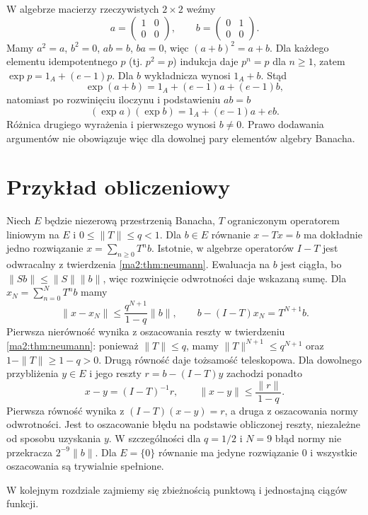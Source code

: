 \begin{przyklad}
\label{ma2:ex:exp-noncommuting}
W algebrze macierzy rzeczywistych $2\times2$ weźmy
\[
 a=\begin{pmatrix}1&0\\0&0\end{pmatrix},
 \qquad b=\begin{pmatrix}0&1\\0&0\end{pmatrix}.
\]
Mamy $a^2=a$, $b^2=0$, $ab=b$, $ba=0$,
więc $(a+b)^2=a+b$. Dla każdego elementu
idempotentnego $p$ (tj. $p^2=p$) indukcja daje
$p^n=p$ dla $n\ge1$, zatem
$\exp p=1_A+(e-1)p$. Dla $b$ wykładnicza
wynosi $1_A+b$. Stąd
\[
 \exp(a+b)=1_A+(e-1)a+(e-1)b,
\]
natomiast po rozwinięciu iloczynu i podstawieniu $ab=b$
\[
 (\exp a)(\exp b)=1_A+(e-1)a+eb.
\]
Różnica drugiego wyrażenia i pierwszego wynosi $b\ne0$.
Prawo dodawania argumentów nie obowiązuje więc
dla dowolnej pary elementów algebry Banacha.
\end{przyklad}

\section{Przykład obliczeniowy}

\begin{przyklad}
\label{ma2:ex:neumann-equation}
Niech $E$ będzie niezerową przestrzenią Banacha,
$T$ ograniczonym operatorem liniowym na $E$
i $0\le\|T\|\le q<1$.
Dla $b\in E$ równanie $x-Tx=b$ ma dokładnie jedno
rozwiązanie
$x=\sum_{n\ge0}T^nb$.
Istotnie, w algebrze operatorów $I-T$ jest odwracalny
z twierdzenia \ref{ma2:thm:neumann}.
Ewaluacja na $b$ jest ciągła, bo
$\|Sb\|\le\|S\|\|b\|$, więc rozwinięcie odwrotności
daje wskazaną sumę. Dla
$x_N=\sum_{n=0}^N T^nb$ mamy
\[
 \|x-x_N\|\le\frac{q^{N+1}}{1-q}\|b\|,
 \qquad b-(I-T)x_N=T^{N+1}b.
\]
Pierwsza nierówność wynika z oszacowania reszty
w twierdzeniu \ref{ma2:thm:neumann}: ponieważ
$\|T\|\le q$, mamy $\|T\|^{N+1}\le q^{N+1}$
oraz $1-\|T\|\ge1-q>0$.
Drugą równość daje tożsamość teleskopowa.
Dla dowolnego przybliżenia $y\in E$ i jego reszty
$r=b-(I-T)y$ zachodzi ponadto
\[
 x-y=(I-T)^{-1}r,\qquad
 \|x-y\|\le\frac{\|r\|}{1-q}.
\]
Pierwsza równość wynika z $(I-T)(x-y)=r$,
a druga z oszacowania normy odwrotności.
Jest to oszacowanie błędu na podstawie obliczonej
reszty, niezależne od sposobu uzyskania $y$.
W szczególności dla $q=1/2$ i $N=9$
błąd normy nie przekracza $2^{-9}\|b\|$.
Dla $E=\{0\}$ równanie ma jedyne rozwiązanie $0$
i wszystkie oszacowania są trywialnie spełnione.
\end{przyklad}

W kolejnym rozdziale zajmiemy się zbieżnością
punktową i jednostajną ciągów funkcji.

